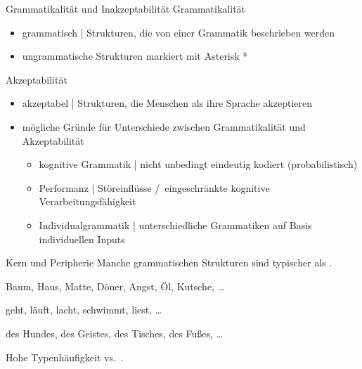 \begin{frame}
  {Grammatikalität und Inakzeptabilität}
  \onslide<+->
  \onslide<+->
  \alert{Grammatikalität}\\
  \Halbzeile
  \begin{itemize}[<+->]
    \item grammatisch | Strukturen, die von einer Grammatik beschrieben werden
    \item ungrammatische Strukturen markiert mit Asterisk *
  \end{itemize}
  \Zeile
  \alert{Akzeptabilität}
  \Halbzeile
  \begin{itemize}[<+->]
    \item akzeptabel | Strukturen, die Menschen als ihre Sprache akzeptieren
    \item mögliche Gründe für Unterschiede zwischen Grammatikalität und Akzeptabilität
      \begin{itemize}[<+->]
        \item kognitive Grammatik | nicht unbedingt eindeutig kodiert (probabilistisch)
        \item Performanz | Störeinflüsse \slash\ eingeschränkte kognitive Verarbeitungsfähigkeit
        \item Individualgrammatik | unterschiedliche Grammatiken auf Basis individuellen Inputs
      \end{itemize}
  \end{itemize}
\end{frame}

\begin{frame}
  {Kern und Peripherie}
  \onslide<+->
  \onslide<+->
  Manche grammatischen Strukturen sind \alert{typischer} als .\\
  \Zeile
  \onslide<+->
  \begin{exe}
    \ex\label{ex:kernundperipherie022}
      \begin{xlist}
        \ex \alert{Baum, Haus, Matte, Döner, Angst, Öl, Kutsche, \ldots}
        \ex {}
      \end{xlist}
      \onslide<+->
      \ex
      \begin{xlist}
        \ex \alert{geht, läuft, lacht, schwimmt, liest, \ldots}
        \ex {}
      \end{xlist}
      \onslide<+->
      \ex
      \begin{xlist}
        \ex \alert{des Hundes, des Geistes, des Tisches, des Fußes, \ldots}
        \ex {}
      \end{xlist}
  \end{exe}
  \onslide<+->
  \Zeile
  \Large
  \centering
  \alert{Hohe Typenhäufigkeit} vs.\ .  
\end{frame}

